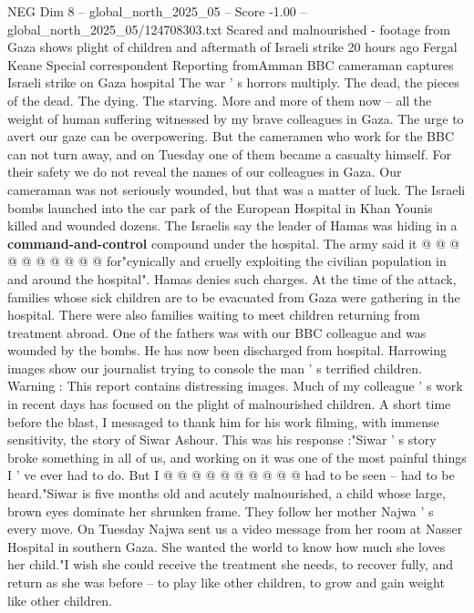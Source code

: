 \begin{textsample}{NEG Dim 8 – global\_north\_2025\_05 – Score -1.00 – global\_north\_2025\_05/124708303.txt}  \label{ex:f8_neg_411}
Scared and malnourished - footage from Gaza shows plight of children and aftermath of Israeli strike 20 hours ago Fergal Keane Special correspondent Reporting fromAmman BBC cameraman captures Israeli strike on Gaza hospital The war ' s horrors multiply.
The dead, the pieces of the dead.
The dying.
The starving.
More and more of them now -- all the weight of human suffering witnessed by my brave colleagues in Gaza.
The urge to avert our gaze can be overpowering.
But the cameramen who work for the BBC can not turn away, and on Tuesday one of them became a casualty himself.
For their safety we do not reveal the names of our colleagues in Gaza.
Our cameraman was not seriously wounded, but that was a matter of luck.
The Israeli bombs launched into the car park of the European Hospital in Khan Younis killed and wounded dozens.
The Israelis say the leader of Hamas was hiding in a \textbf{command-and-control} compound under the hospital.
The army said it @ @ @ @ @ @ @ @ @ @ for"cynically and cruelly exploiting the civilian population in and around the hospital".
Hamas denies such charges.
At the time of the attack, families whose sick children are to be evacuated from Gaza were gathering in the hospital.
There were also families waiting to meet children returning from treatment abroad.
One of the fathers was with our BBC colleague and was wounded by the bombs.
He has now been discharged from hospital.
Harrowing images show our journalist trying to console the man ' s terrified children.
Warning : This report contains distressing images.
Much of my colleague ' s work in recent days has focused on the plight of malnourished children.
A short time before the blast, I messaged to thank him for his work filming, with immense sensitivity, the story of Siwar Ashour.
This was his response :"Siwar ' s story broke something in all of us, and working on it was one of the most painful things I ' ve ever had to do.
But I @ @ @ @ @ @ @ @ @ @ had to be seen -- had to be heard."Siwar is five months old and acutely malnourished, a child whose large, brown eyes dominate her shrunken frame.
They follow her mother Najwa ' s every move.
On Tuesday Najwa sent us a video message from her room at Nasser Hospital in southern Gaza.
She wanted the world to know how much she loves her child."I wish she could receive the treatment she needs, to recover fully, and return as she was before -- to play like other children, to grow and gain weight like other children.

\end{textsample}

